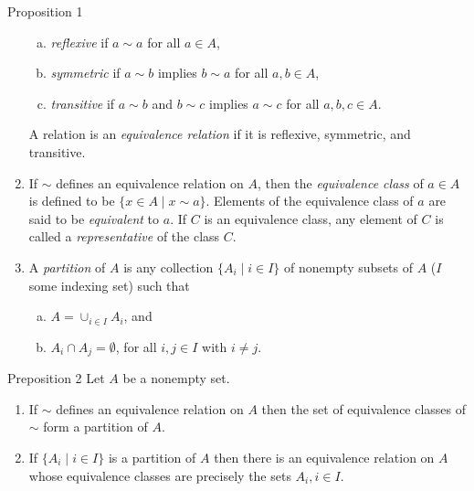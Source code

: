 \begin{namedthm*}{Proposition 1}
\begin{enumerate}[(1)]
        \begin{enumerate}[(a)]
            \item \textit{reflexive} if $a\sim a$ for all $a\in A$,
            \item \textit{symmetric} if $a\sim b$ implies $b\sim a$ for all $a,b\in A$,
            \item \textit{transitive} if $a\sim b$ and $b\sim c$ implies $a\sim c$ for all $a,b,c\in A$.
        \end{enumerate}
        A relation is an \textit{equivalence relation} if it is reflexive, symmetric, and transitive.
        \item If $\sim$ defines an equivalence relation on $A$, then the \textit{equivalence class} of $a\in A$ is defined to be $\{x\in A\mid x\sim a\}$.
        Elements of the equivalence class of $a$ are said to be \textit{equivalent} to $a$.
        If $C$ is an equivalence class, any element of $C$ is called a \textit{representative} of the class $C$.
        \item A \textit{partition} of $A$ is any collection $\{A_i\mid i\in I\}$ of nonempty subsets of $A$ ($I$ some indexing set) such that 
        \begin{enumerate}[(a)]
            \item $A=\cup_{i\in I}A_i$, and 
            \item $A_i\cap A_j=\emptyset$, for all $i,j\in I$ with $i\neq j$.
        \end{enumerate}
    \end{enumerate}
    \begin{namedthm*}{Preposition 2}
        Let $A$ be a nonempty set.
        \begin{enumerate}[(1)]
            \item If $\sim$ defines an equivalence relation on $A$ then the set of equivalence classes of $\sim$ form a partition of $A$.
            \item If $\{A_i\mid i\in I\}$ is a partition of $A$ then there is an equivalence relation on $A$ whose equivalence classes are precisely the sets $A_i,i\in I$.
        \end{enumerate}
    \end{namedthm*}
\end{namedthm*}
